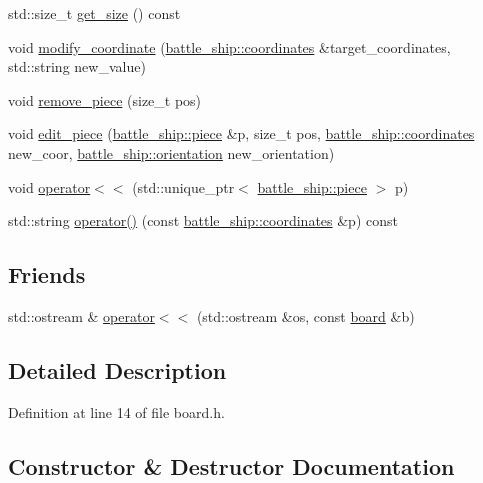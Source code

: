 \begin{DoxyCompactItemize}
\item 
std\+::size\+\_\+t \hyperlink{classbattle__ship_1_1board_aea7bba93d5c16b0c550b5874e0ce04a7}{get\+\_\+size} () const
\item 
void \hyperlink{classbattle__ship_1_1board_a9dd8f7b3681cc8ed1c5309a796f377e2}{modify\+\_\+coordinate} (\hyperlink{structbattle__ship_1_1coordinates}{battle\+\_\+ship\+::coordinates} \&target\+\_\+coordinates, std\+::string new\+\_\+value)
\item 
void \hyperlink{classbattle__ship_1_1board_a19d236125f444778e5789109d9c1093b}{remove\+\_\+piece} (size\+\_\+t pos)
\item 
void \hyperlink{classbattle__ship_1_1board_a3f6a458721d6f0cfbf167f5568539296}{edit\+\_\+piece} (\hyperlink{classbattle__ship_1_1piece}{battle\+\_\+ship\+::piece} \&p, size\+\_\+t pos, \hyperlink{structbattle__ship_1_1coordinates}{battle\+\_\+ship\+::coordinates} new\+\_\+coor, \hyperlink{namespacebattle__ship_aed87488f0a73f0d0679fe343fb61c784}{battle\+\_\+ship\+::orientation} new\+\_\+orientation)
\item 
void \hyperlink{classbattle__ship_1_1board_a9afa4baeef0df47e4a2efe05de9cb8eb}{operator$<$$<$} (std\+::unique\+\_\+ptr$<$ \hyperlink{classbattle__ship_1_1piece}{battle\+\_\+ship\+::piece} $>$ p)
\item 
std\+::string \hyperlink{classbattle__ship_1_1board_ade89ae8272e10d6c47a8d4f2c2927d0a}{operator()} (const \hyperlink{structbattle__ship_1_1coordinates}{battle\+\_\+ship\+::coordinates} \&p) const
\end{DoxyCompactItemize}
\subsection*{Friends}
\begin{DoxyCompactItemize}
\item 
std\+::ostream \& \hyperlink{classbattle__ship_1_1board_a1a31fc970cf43cac6d5b1a44e3831f5d}{operator$<$$<$} (std\+::ostream \&os, const \hyperlink{classbattle__ship_1_1board}{board} \&b)
\end{DoxyCompactItemize}


\subsection{Detailed Description}


Definition at line 14 of file board.\+h.



\subsection{Constructor \& Destructor Documentation}
\mbox{\label{classbattle__ship_1_1board_a4d561505fe0c5d355e70bbd2bde1b00e}} 
